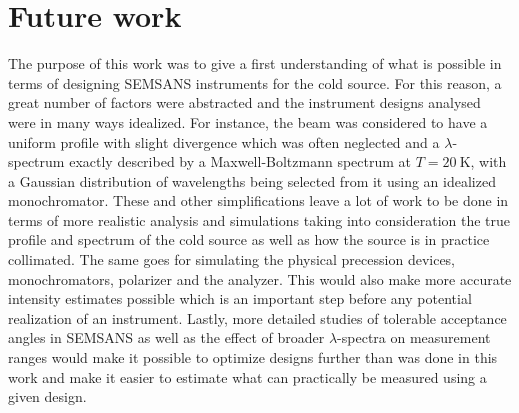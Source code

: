 \section{Future work}
The purpose of this work was to give a first understanding of what is possible in terms of designing SEMSANS instruments for the cold source. For this reason, a great number of factors were abstracted and the instrument designs analysed were in many ways idealized. For instance, the beam was considered to have a uniform profile with slight divergence which was often neglected and a $\lambda$-spectrum exactly described by a Maxwell-Boltzmann spectrum at $T= \SI{20}{\kelvin}$, with a Gaussian distribution of wavelengths being selected from it using an idealized monochromator. These and other simplifications leave a lot of work to be done in terms of more realistic analysis and simulations taking into consideration the true profile and spectrum of the cold source as well as how the source is in practice collimated. The same goes for simulating the physical precession devices, monochromators, polarizer and the analyzer. This would also make more accurate intensity estimates possible which is an important step before any potential realization of an instrument. Lastly, more detailed studies of tolerable acceptance angles in SEMSANS as well as the effect of broader $\lambda$-spectra on measurement ranges would make it possible to optimize designs further than was done in this work and make it easier to estimate what can practically be measured using a given design.